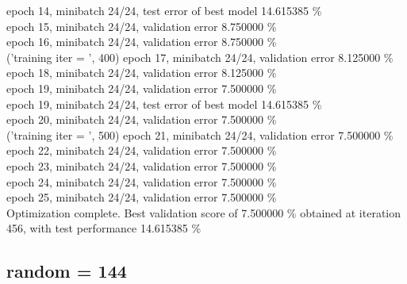 \documentclass[a4paper]{article}
\begin{document}
     epoch 14, minibatch 24/24, test error of best model 14.615385 \% \\
epoch 15, minibatch 24/24, validation error 8.750000 \% \\
epoch 16, minibatch 24/24, validation error 8.750000 \% \\
('training \@ iter = ', 400)
epoch 17, minibatch 24/24, validation error 8.125000 \% \\
epoch 18, minibatch 24/24, validation error 8.125000 \% \\
epoch 19, minibatch 24/24, validation error 7.500000 \% \\
     epoch 19, minibatch 24/24, test error of best model 14.615385 \% \\
epoch 20, minibatch 24/24, validation error 7.500000 \% \\
('training \@ iter = ', 500)
epoch 21, minibatch 24/24, validation error 7.500000 \% \\
epoch 22, minibatch 24/24, validation error 7.500000 \% \\
epoch 23, minibatch 24/24, validation error 7.500000 \% \\
epoch 24, minibatch 24/24, validation error 7.500000 \% \\
epoch 25, minibatch 24/24, validation error 7.500000 \% \\
Optimization complete.
Best validation score of 7.500000 \% obtained at iteration 456, with test performance 14.615385 \% \\

\subsection{random = 144}
\end{document}
